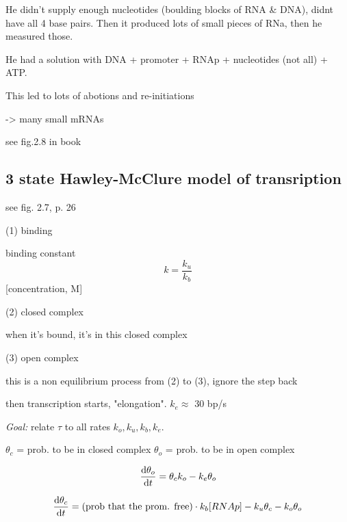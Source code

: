 \documentclass{article}
\begin{document}
He didn't supply enough nucleotides (boulding blocks of RNA \& DNA), didnt have all 4 base pairs. Then it produced lots of small pieces of RNa, then he measured those. 

He had a solution with DNA + promoter + RNAp + nucleotides (not all) + ATP. 

This led to lots of abotions and re-initiations

-> many small mRNAs

see fig.2.8 in book



\subsection{3 state Hawley-McClure model of transription}

see fig. 2.7, p. 26

(1) binding

binding constant
\begin{equation}
	k = \frac{k_{u}}{k_{b}}
\end{equation}
[concentration, M]

(2) closed complex

when it's bound, it's in this closed complex


(3) open complex



this is a non equilibrium process from (2) to (3), ignore the step back 

then transcription starts, "elongation". $k_{e} \approx $ 30 bp/s

\textit{Goal:} relate $\tau$ to all rates $k_{o}, k_{u}, k_{b}, k_{e}. $

$\theta_{c}$ = prob. to be in closed complex
$\theta_{o}$ = prob. to be in open complex

\begin{equation}
	\dv{\theta_{o}}{t} = \theta_{c}k_{o} - k_{e}\theta_{o}
\end{equation}



\begin{equation}
	\begin{split}
		\dv{\theta_{c}}{t} =(\text{prob that the prom. free}) \cdot k_{b}[RNAp] - k_{u}\theta_{c} - k_{o}\theta_{o} %
	\end{split}
\end{equation}
\end{document}
